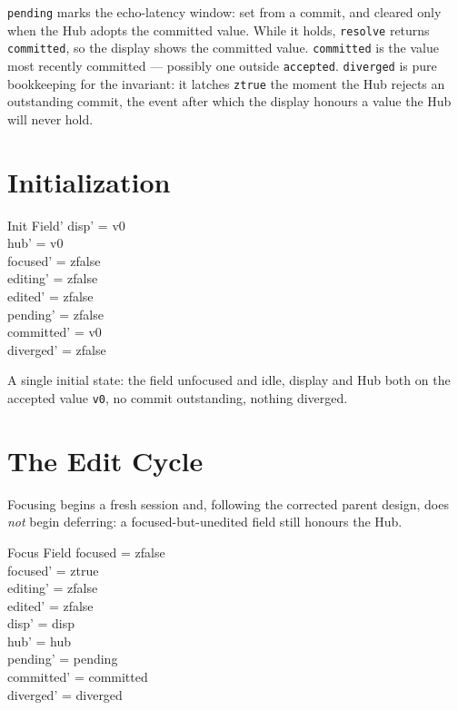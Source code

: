 \documentclass[a4paper,10pt,fleqn]{article}
\begin{document}
\texttt{pending} marks the echo-latency window: set from a commit, and cleared
only when the Hub adopts the committed value.  While it holds, \texttt{resolve}
returns \texttt{committed}, so the display shows the committed value.
\texttt{committed} is the value most recently committed --- possibly one outside
\texttt{accepted}.  \texttt{diverged} is pure bookkeeping for the invariant: it
latches \texttt{ztrue} the moment the Hub rejects an outstanding commit, the event
after which the display honours a value the Hub will never hold.

\section{Initialization}

\begin{schema}{Init}
  Field'
\where
  disp' = v0 \\
  hub' = v0 \\
  focused' = zfalse \\
  editing' = zfalse \\
  edited' = zfalse \\
  pending' = zfalse \\
  committed' = v0 \\
  diverged' = zfalse
\end{schema}

A single initial state: the field unfocused and idle, display and Hub both on the
accepted value \texttt{v0}, no commit outstanding, nothing diverged.

\section{The Edit Cycle}

Focusing begins a fresh session and, following the corrected parent design, does
\emph{not} begin deferring: a focused-but-unedited field still honours the Hub.

\begin{schema}{Focus}
  \Delta Field
\where
  focused = zfalse \\
  focused' = ztrue \\
  editing' = zfalse \\
  edited' = zfalse \\
  disp' = disp \\
  hub' = hub \\
  pending' = pending \\
  committed' = committed \\
  diverged' = diverged
\end{schema}
\end{document}

